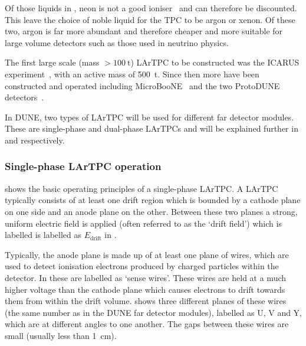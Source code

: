 Of those liquids in , neon is not a good ioniser~\cite{schumann2012dark} and can therefore be discounted.
This leave the choice of noble liquid for the TPC to be argon or xenon.
Of these two, argon is far more abundant and therefore cheaper and more suitable for large volume detectors such as those used in neutrino physics.

The first large scale (mass $>\SI{100}{\tonne}$) LArTPC to be constructed was the ICARUS experiment~\cite{icarus}, with an active mass of \SI{500}{\tonne}.
Since then more have been constructed and operated including MicroBooNE~\cite{uBooneConstruct} and the two ProtoDUNE detectors~\cite{protoduneSP_tdr, cuesta2019status}.

In DUNE, two types of LArTPC will be used for different far detector modules.
These are single-phase and dual-phase LArTPCs and will be explained further in  and  respectively.

\subsubsection{Single-phase LArTPC operation}
\label{sec:dune:fd:lartpc:singlephase}

 shows the basic operating principles of a single-phase LArTPC.
A LArTPC typically consists of at least one drift region which is bounded by a cathode plane on one side and an anode plane on the other.
Between these two planes a strong, uniform electric field is applied (often referred to as the `drift field') which is labelled is labelled as $E_{\text{drift}}$ in .

Typically, the anode plane is made up of at least one plane of wires, which are used to detect ionisation electrons produced by charged particles within the detector.
In  these are labelled as `sense wires'.
These wires are held at a much higher voltage than the cathode plane which causes electrons to drift towards them from within the drift volume.
 shows three different planes of these wires (the same number as in the DUNE far detector modules), labelled as U, V and Y, which are at different angles to one another.
The gaps between these wires are small (usually less than \SI{1}{\centi\metre}).


